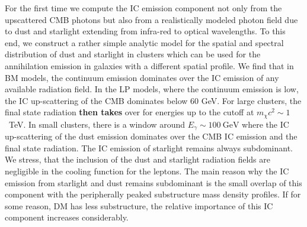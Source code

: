 \documentclass[10pt,aps,pra,reprint,amsmath,amsfonts,amssymb,showpacs,nofootinbib,floatfix]{revtex4-1}
\def\del#1{{}}
\def\C#1{{\bf #1}}
\begin{document}
For the first time we compute the IC emission component not only from
the upscattered CMB photons but also from a realistically modeled
photon field due to dust and starlight extending from infra-red to
optical wavelengths. To this end, we construct a rather simple
analytic model for the spatial and spectral distribution of dust and
starlight in clusters which can be used for the annihilation emission
in galaxies with a different spatial profile.  We find that in BM
models, the continuum emission dominates over the IC emission of any
available radiation field. In the LP models, where the continuum
emission is low, the IC up-scattering of the CMB dominates below 60
GeV. For large clusters, the final state radiation \C{then takes}
\del{takes then} over for energies up to the cutoff at $m_\chi c^2
\sim 1$~TeV. In small clusters, there is a window around $E_\gamma
\sim 100~\mathrm{GeV}$ where the IC up-scattering of the dust emission
dominates over the CMB IC emission and the final state radiation. The
IC emission of starlight remains always subdominant.  We stress, that
the inclusion of the dust and starlight radiation fields are
negligible in the cooling function for the leptons.  The main reason
why the IC emission from starlight and dust remains subdominant is the
small overlap of this component with the peripherally peaked
substructure mass density profiles. If for some reason, DM has less
substructure, the relative importance of this IC component increases
considerably.
\end{document}
